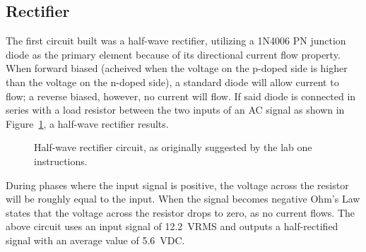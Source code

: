 \subsection{Rectifier}
The first circuit built was a half-wave rectifier, utilizing a 1N4006 PN
junction diode as the primary element because of its directional current flow
property.  When forward biased (acheived when the voltage on the p-doped side
is higher than the voltage on the n-doped side), a standard diode will allow
current to flow; a reverse biased, however, no current will flow.  If said
diode is connected in series with a load resistor between the two inputs of an
AC signal as shown in Figure~\ref{fig:schem1}, a half-wave rectifier results.
%
\begin{figure}[H]
	\centering
	
	\caption{Half-wave rectifier circuit, as originally suggested by the lab one instructions.}
	\label{fig:schem1}
\end{figure}
%
During phases where the input signal is positive, the voltage across the
resistor will be roughly equal to the input.  When the signal becomes negative
Ohm's Law states that the voltage across the resistor drops to zero, as no
current flows.  The above circuit uses an input signal of \SI{12.2}{\volt}RMS
and outputs a half-rectified signal with an average value of \SI{5.6}{\volt}DC.

\begin{figure}[H]

\end{figure}

\begin{figure}[H]

\end{figure}

\begin{figure}[H]

\end{figure}

